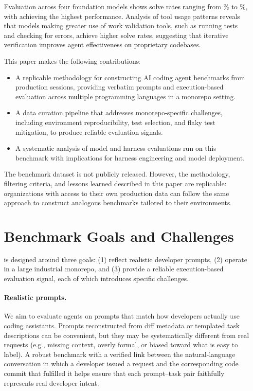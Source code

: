 Evaluation across four foundation models shows solve rates ranging from \SolveRateLowest{}\% to \SolveRateHighest{}\%, with \SolveRateBestModel{} achieving the highest performance.
Analysis of tool usage patterns reveals that models making greater use of work validation tools, such as running tests and checking for errors, achieve higher solve rates, suggesting that iterative verification improves agent effectiveness on proprietary codebases.

This paper makes the following contributions:
\begin{itemize}
\item A replicable methodology for constructing AI coding agent benchmarks from production sessions, providing verbatim prompts and execution-based evaluation across multiple programming languages in a monorepo setting.
\item A data curation pipeline that addresses monorepo-specific challenges, including environment reproducibility, test selection, and flaky test mitigation, to produce reliable evaluation signals.
\item A systematic analysis of model and harness evaluations run on this benchmark with implications for harness engineering and model deployment.
\end{itemize}

The benchmark dataset is not publicly released. However, the methodology, filtering criteria, and lessons learned described in this paper are replicable: organizations with access to their own production data can follow the same approach to construct analogous benchmarks tailored to their environments.

\section{Benchmark Goals and Challenges}
\label{sec:challenges}

\benchmark{} is designed around three goals: (1) reflect realistic developer prompts, (2) operate in a large industrial monorepo, and (3) provide a reliable execution-based evaluation signal, each of which introduces specific challenges.

\paragraph{Realistic prompts.}
We aim to evaluate agents on prompts that match how developers actually use coding assistants.
Prompts reconstructed from diff metadata or templated task descriptions can be convenient, but they may be systematically different from real requests (e.g., missing context, overly formal, or biased toward what is easy to label).
A robust benchmark with a verified link between the natural-language conversation in which a developer issued a request and the corresponding code commit that fulfilled it helps ensure that each prompt--task pair faithfully represents real developer intent.


